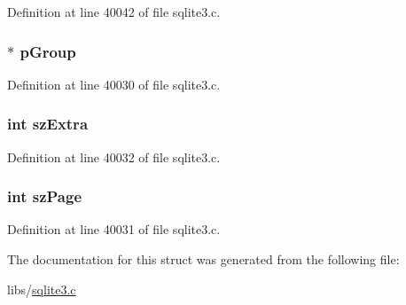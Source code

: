 Definition at line 40042 of file sqlite3.\+c.

\hypertarget{struct_p_cache1_a602f5f72c82f657ab4e3003e2761d4f5}{}
\subsubsection[{p\+Group}]{$\ast$ p\+Group}\label{struct_p_cache1_a602f5f72c82f657ab4e3003e2761d4f5}


Definition at line 40030 of file sqlite3.\+c.

\hypertarget{struct_p_cache1_aa6d33a46ecc20cbe1700c74a12b4fb14}{}
\subsubsection[{sz\+Extra}]{\setlength{\rightskip}{0pt plus 5cm}int sz\+Extra}\label{struct_p_cache1_aa6d33a46ecc20cbe1700c74a12b4fb14}


Definition at line 40032 of file sqlite3.\+c.

\hypertarget{struct_p_cache1_a0ead96b04a1cc6dc6ec781782e82d052}{}
\subsubsection[{sz\+Page}]{\setlength{\rightskip}{0pt plus 5cm}int sz\+Page}\label{struct_p_cache1_a0ead96b04a1cc6dc6ec781782e82d052}


Definition at line 40031 of file sqlite3.\+c.



The documentation for this struct was generated from the following file\+:\begin{DoxyCompactItemize}
\item 
libs/\hyperlink{sqlite3_8c}{sqlite3.\+c}\end{DoxyCompactItemize}
